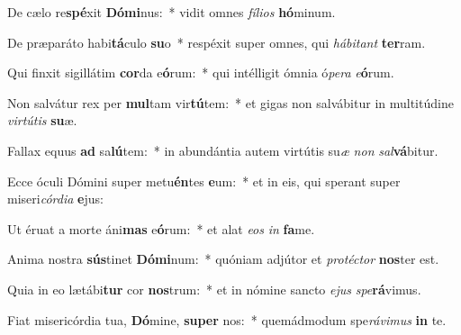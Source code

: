 \item De cælo re\textbf{spé}xit \textbf{Dó}\textbf{mi}nus:~* vidit omnes \textit{fí}\textit{li}\textit{os} \textbf{hó}minum.
\item De præparáto habi\textbf{tá}culo \textbf{su}o~* respéxit super omnes, qui \textit{há}\textit{bi}\textit{tant} \textbf{ter}ram.
\item Qui finxit sigillátim \textbf{cor}da e\textbf{ó}rum:~* qui intélligit ómnia ó\textit{pe}\textit{ra} \textit{e}\textbf{ó}rum.
\item Non salvátur rex per \textbf{mul}tam vir\textbf{tú}tem:~* et gigas non salvábitur in multitúdine \textit{vir}\textit{tú}\textit{tis} \textbf{su}æ.
\item Fallax equus \textbf{ad} sa\textbf{lú}tem:~* in abundántia autem virtútis su\textit{æ} \textit{non} \textit{sal}\textbf{vá}bitur.
\item Ecce óculi Dómini super metu\textbf{én}tes \textbf{e}um:~* et in eis, qui sperant super miseri\textit{cór}\textit{di}\textit{a} \textbf{e}jus:
\item Ut éruat a morte áni\textbf{mas} e\textbf{ó}rum:~* et alat \textit{e}\textit{os} \textit{in} \textbf{fa}me.
\item Anima nostra \textbf{sús}tinet \textbf{Dó}\textbf{mi}num:~* quóniam adjútor et \textit{pro}\textit{téc}\textit{tor} \textbf{nos}ter est.
\item Quia in eo lætábi\textbf{tur} cor \textbf{nos}trum:~* et in nómine sancto \textit{e}\textit{jus} \textit{spe}\textbf{rá}vimus.
\item Fiat misericórdia tua, \textbf{Dó}mine, \textbf{su}\textbf{per} nos:~* quemádmodum spe\textit{rá}\textit{vi}\textit{mus} \textbf{in} te.

